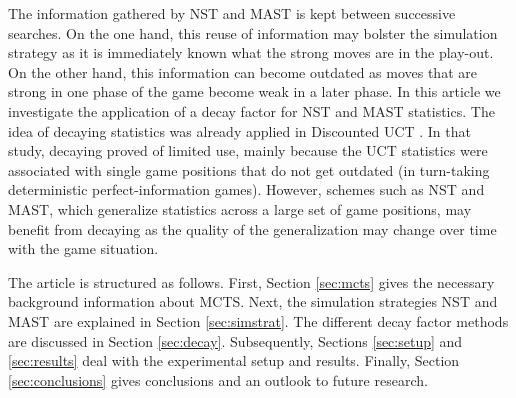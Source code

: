 \documentclass[journal]{IEEEtran}
\begin{document}
The information gathered by NST and MAST is kept between successive searches. On the one hand, this reuse of information may bolster the simulation strategy as it is immediately known what the strong moves are in the play-out. On the other hand, this information can become outdated as  moves that  are strong in one phase of the game become weak in a later phase. In this article we investigate the application of a decay factor for NST and MAST statistics. The idea of decaying statistics was already applied in Discounted UCT \cite{acceleratedUCT}. In that study, decaying proved of limited use, mainly because the UCT statistics were associated with single game positions that do not get outdated (in turn-taking deterministic perfect-information games). However, schemes such as NST and MAST, which generalize statistics across a large set of game positions, may benefit from decaying as the quality of the generalization may change over time with the game situation.

The article is structured as follows. First, Section \ref{sec:mcts} gives the necessary background information about  MCTS. Next, the simulation strategies NST and MAST are explained in Section \ref{sec:simstrat}. The different decay factor methods are discussed in Section \ref{sec:decay}. Subsequently, Sections \ref{sec:setup} and \ref{sec:results} deal with the experimental setup and results. Finally, Section \ref{sec:conclusions} gives conclusions and an outlook to future research. 
\end{document}
